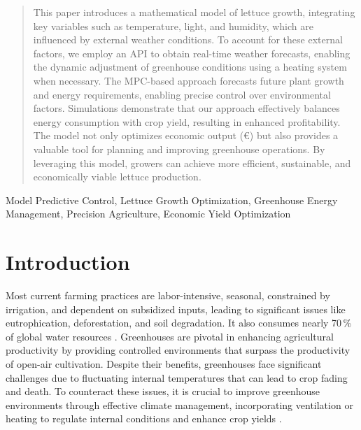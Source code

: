 \documentclass[conference]{IEEEtran}
\begin{document}
\begin{abstract}
This paper introduces a mathematical model of lettuce growth, integrating key variables such as temperature, light, and humidity, which are influenced by external weather conditions. To account for these external factors, we employ an API to obtain real-time weather forecasts, enabling the dynamic adjustment of greenhouse conditions using a heating system when necessary. The MPC-based approach forecasts future plant growth and energy requirements, enabling precise control over environmental factors. Simulations demonstrate that our approach effectively balances energy consumption with crop yield, resulting in enhanced profitability. The model not only optimizes economic output (€) but also provides a valuable tool for planning and improving greenhouse operations.
By leveraging this model, growers can achieve more efficient, sustainable, and economically viable lettuce production. 
\newline
\end{abstract}
\begin{IEEEkeywords}
Model Predictive Control, Lettuce Growth Optimization, Greenhouse Energy Management, Precision Agriculture, Economic Yield Optimization
\end{IEEEkeywords}


\section{Introduction}
Most current farming practices are labor-intensive, seasonal, constrained by irrigation, and dependent on subsidized inputs, leading to significant issues like eutrophication, deforestation, and soil degradation. It also consumes nearly 70\,\% of global water resources \cite{Debroy2024}. Greenhouses are pivotal in enhancing agricultural productivity by providing controlled environments that surpass the productivity of open-air cultivation. Despite their benefits, greenhouses face significant challenges due to fluctuating internal temperatures that can lead to crop fading and death. To counteract these issues, it is crucial to improve greenhouse environments through effective climate management, incorporating ventilation or heating to regulate internal conditions and enhance crop yields \cite{Wu2019}.
\end{document}
